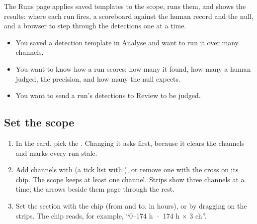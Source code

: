 The Runs page applies saved templates to the scope, runs them, and shows the results: where each
run fires, a scoreboard against the human record and the null, and a browser to step through the
detections one at a time.

\begin{itemize}
  \item You saved a detection template in Analyse and want to run it over many channels.
  \item You want to know how a run scores: how many it found, how many a human judged, the
        precision, and how many the null expects.
  \item You want to send a run's detections to Review to be judged.
\end{itemize}



\subsection*{Set the scope}
\begin{enumerate}
  \item In the  card, pick the . Changing it asks first, because it clears
        the channels and marks every run stale.
  \item Add channels with  (a tick list with ), or remove one with the
        cross on its chip. The scope keeps at least one channel. Strips show three channels at a
        time; the arrows beside them page through the rest.
  \item Set the section with the  chip (from and to, in hours), or by dragging on the
        strips. The chip reads, for example, ``0--174 h · 174 h \(\times\) 3 ch''.
\end{enumerate}

